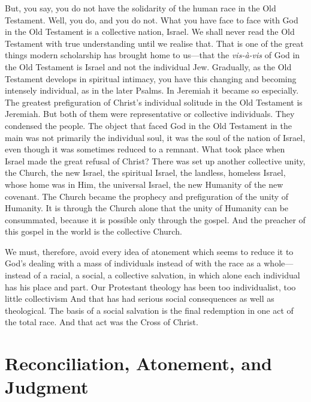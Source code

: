 \documentclass[12pt,a5paper,twoside,titlepage]{book}
\begin{document}
But, you say, you do not have the solidarity 
of the human race in the Old Testament. Well, 
you do, and you do not. What you have face to 
face with God in the Old Testament is a collective 
nation, Israel. We shall never read the 
Old Testament with true understanding until 
we realise that. That is one of the great things 
modern scholarship has brought home to us---that 
the \textit{vis-\`{a}-vis} of God in the Old Testament is 
Israel and not the individual Jew. Gradually, 
as the Old Testament develops in spiritual intimacy, 
you have this changing and becoming 
intensely individual, as in the later Psalms. In 
Jeremiah it became so especially. The greatest 
prefiguration of Christ's individual solitude in 
the Old Testament is Jeremiah. But both of 
them were representative or collective individuals. 
They condensed the people. The object 
that faced God in the Old Testament in the 
main was not primarily the individual soul, it 
was the soul of the nation of Israel, even 
though it was sometimes reduced to a remnant. 
What took place when Israel made the great 
refusal of Christ? There was set up another 
collective unity, the Church, the new Israel, the 
spiritual Israel, the landless, homeless Israel, 
whose home was in Him, the universal Israel, 
the new Humanity of the new covenant. The 
Church became the prophecy and prefiguration 
of the unity of Humanity. It is through the 
Church alone that the unity of Humanity can 
be consummated, because it is possible only 
through the gospel. And the preacher of this 
gospel in the world is the collective Church. 

We must, therefore, avoid every idea of atonement which seems to reduce it to God's dealing 
with a mass of individuals instead of with the 
race as a whole---instead of a racial, a social, a 
collective salvation, in which alone each individual has his place and part. Our Protestant 
theology has been too individualist, too little 
collectivism And that has had serious social 
consequences as well as theological. The basis 
of a social salvation is the final redemption in 
one act of the total race. And that act was the 
Cross of Christ. 



\chapter{Reconciliation, Atonement, and Judgment} 
\end{document}
